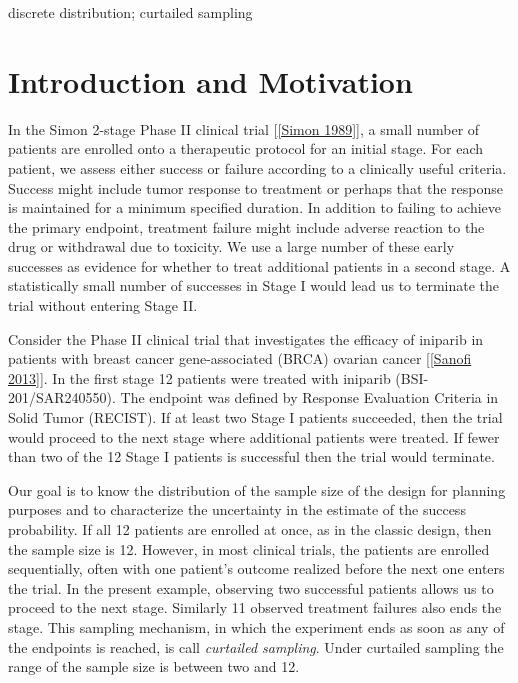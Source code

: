 \documentclass[12pt]{article}         %
\begin{document}
\bigskip

  discrete distribution; curtailed sampling


\thispagestyle{empty}
\setcounter{page}{1}

\section            {Introduction and Motivation}


In the Simon 2-stage Phase II clinical trial [\ref{Simon 1989}], a small 
number of patients are enrolled onto a therapeutic 
protocol for an initial stage. For each patient, we assess either success 
or failure according to a 
clinically useful criteria. Success might include tumor response to treatment
or perhaps that the response is maintained for a minimum specified duration.
In addition to failing to achieve the primary endpoint, treatment failure 
might include adverse reaction to the drug or withdrawal due to toxicity. We 
use a large number of these early successes as evidence for whether to treat
additional patients in a second stage. A statistically small number of 
successes in Stage I would lead us to terminate the trial without entering 
Stage II.

Consider the Phase II clinical trial that investigates the efficacy of 
iniparib in patients with breast cancer gene-associated (BRCA) ovarian 
cancer [\ref{Sanofi 2013}]. In the first stage 12 patients were treated with 
iniparib (BSI-201/SAR240550). The endpoint was defined by Response Evaluation 
Criteria in Solid Tumor (RECIST). If at least two Stage I patients succeeded,
then the trial would proceed to the next stage where additional patients were 
treated. If fewer than two of the 12 Stage I patients is successful then 
the trial would terminate. 

Our goal is to know the distribution of the sample size of the design for 
planning purposes and to characterize the uncertainty in the estimate of the
success probability.  If all 12 patients are enrolled at once, 
as in the classic 
design, then the sample size is 12. However, in most clinical trials, the 
patients are enrolled sequentially, often with one patient's outcome realized 
before the next one enters the trial. In the present example, observing two 
successful patients allows us to proceed to the next stage. Similarly 11 
observed treatment failures also ends the stage. This sampling mechanism, in 
which the experiment ends as soon as any of the endpoints is reached, is 
call {\em curtailed sampling}. Under curtailed sampling the range of the 
sample size is between two and 12.
\end{document}
